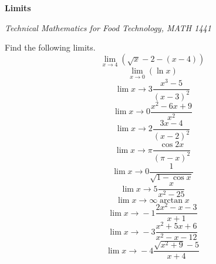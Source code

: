 \documentclass[11pt]{article}
\newcommand{\CourseName}{Technical Mathematics for Food Technology}
\newcommand{\CourseNumber}{1441}
\newcommand{\CourseName}{Technical Mathematics for Geomatics}
\newcommand{\CourseNumber}{1511}
\begin{document}
\textbf{Limits}

\emph{\CourseName, MATH \CourseNumber}

Find the following limits.
\begin{equation}
  \label{eq:voiqueez}
  \lim_{x\rightarrow{}4}(\sqrt{x}-2-(x-4))
\end{equation}
\begin{equation}
  \label{eq:eiwainge}
  \lim_{x\rightarrow{}0}\left(\ln{}x\right)
\end{equation}
\begin{equation}
  \label{eq:wixaetae}
  \lim{x\rightarrow{}3}\frac{x^{3}-5}{(x-3)^{2}}
\end{equation}
\begin{equation}
  \label{eq:axiengie}
  \lim{x\rightarrow{}0}\frac{x^{2}-6x+9}{x^{2}}
\end{equation}
\begin{equation}
  \label{eq:eichokei}
  \lim{x\rightarrow{}2}\frac{3x-4}{(x-2)^{2}}
\end{equation}
\begin{equation}
  \label{eq:xujaekah}
  \lim{x\rightarrow{}\pi}\frac{\cos{}2x}{(\pi-x)^{2}}
\end{equation}
\begin{equation}
  \label{eq:ahphucaj}
  \lim{x\rightarrow{}0}\frac{1}{\sqrt{1-\cos{}x}}
\end{equation}
\begin{equation}
  \label{eq:ieriepoh}
  \lim{x\rightarrow{}5}\frac{x}{x^{2}-25}
\end{equation}
\begin{equation}
  \label{eq:ceekohto}
  \lim{x\rightarrow{}\infty}\arctan{}x
\end{equation}
\begin{equation}
  \label{eq:waengohn}
  \lim{x\rightarrow{}-1}\frac{2x^{2}-x-3}{x+1}
\end{equation}
\begin{equation}
  \label{eq:aiceiphu}
  \lim{x\rightarrow{}-3}\frac{x^{2}+5x+6}{x^{2}-x-12}
\end{equation}
\begin{equation}
  \label{eq:iidooziu}
  \lim{x\rightarrow{}-4}\frac{\sqrt{x^{2}+9}-5}{x+4}
\end{equation}

\end{document}
